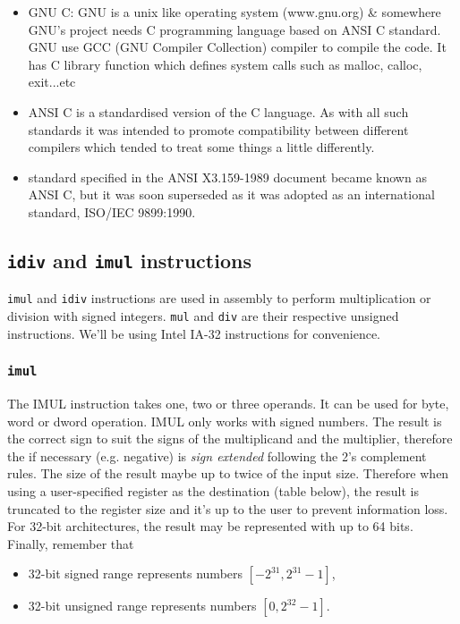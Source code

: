 \documentclass[a4paper]{article}
\begin{document}
\begin{itemize}
    \item GNU C: GNU is a unix like operating system (www.gnu.org) \& somewhere GNU's project needs C programming language based on ANSI C standard. GNU use GCC (GNU Compiler Collection) compiler to compile the code. It has C library function which defines system calls such as malloc, calloc, exit...etc
    \item ANSI C is a standardised version of the C language. As with all such standards it was intended to promote compatibility between different compilers which tended to treat some things a little differently.
    \item standard specified in the ANSI X3.159-1989 document became known as ANSI C, but it was soon superseded as it was adopted as an international standard, ISO/IEC 9899:1990.
\end{itemize}




\newpage
\subsection{\texttt{idiv} and \texttt{imul} instructions}
\label{app:idiv_imul}
\texttt{imul} and \texttt{idiv} instructions are used in assembly to perform multiplication or division with signed integers. \texttt{mul} and \texttt{div} are their respective unsigned instructions. We'll be using Intel IA-32 instructions for convenience. 


\subsubsection{\texttt{imul}}
 

The IMUL instruction takes one, two or three operands. It can be used for byte, word or dword operation. IMUL only works with signed numbers. The result is the correct sign to suit the signs of the multiplicand and the multiplier, therefore the if necessary (e.g. negative) is \textit{sign extended} following the 2's complement rules. The size of the result maybe up to twice of the input size. Therefore when using a user-specified register as the destination (table below), the result is truncated to the register size and it's up to the user to prevent information loss. For 32-bit architectures, the result may be represented with up to 64 bits. Finally, remember that 
\begin{itemize}
    \item 32-bit signed range represents numbers $[-2^{31},2^{31}-1]$,
    \item 32-bit unsigned range represents numbers $[0, 2^{32}-1]$.
\end{itemize}
\end{document}
